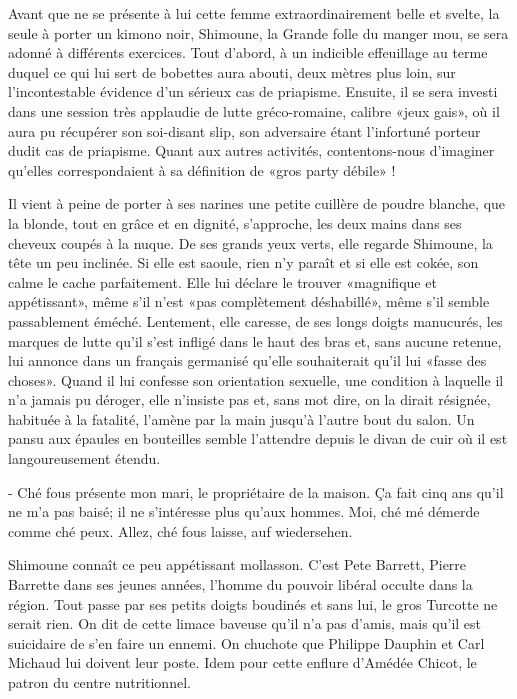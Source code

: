 Avant que ne se présente à lui cette femme extraordinairement belle et svelte, la seule à porter un kimono noir, Shimoune, la Grande folle du manger mou, se sera adonné à différents exercices. Tout d’abord, à un indicible effeuillage au terme duquel ce qui lui sert de bobettes aura abouti, deux mètres plus loin, sur l’incontestable évidence d’un sérieux cas de priapisme. Ensuite, il se sera investi dans une session très applaudie de lutte gréco-romaine, calibre «jeux gais», où il aura pu récupérer son soi-disant slip, son adversaire étant l’infortuné porteur dudit cas de priapisme. Quant aux autres activités, contentons-nous d’imaginer qu’elles correspondaient à sa définition de «gros party débile» !

Il vient à peine de porter à ses narines une petite cuillère de poudre blanche, que la blonde, tout en grâce et en dignité, s’approche, les deux mains dans ses cheveux coupés à la nuque. De ses grands yeux verts, elle regarde Shimoune, la tête un peu inclinée. Si elle est saoule, rien n’y paraît et si elle est cokée, son calme le cache parfaitement. Elle lui déclare le trouver «magnifique et appétissant», même s’il n’est «pas complètement déshabillé», même s’il semble passablement éméché. Lentement, elle caresse, de ses longs doigts manucurés, les marques de lutte qu’il s’est infligé dans le haut des bras et, sans aucune retenue, lui annonce dans un français germanisé qu’elle souhaiterait qu’il lui «fasse des choses». Quand il lui confesse son orientation sexuelle, une condition à laquelle il n’a jamais pu déroger, elle n’insiste pas et, sans mot dire, on la dirait résignée, habituée à la fatalité, l’amène par la main jusqu’à l’autre bout du salon. Un pansu aux épaules en bouteilles semble l’attendre depuis le divan de cuir où il est langoureusement étendu.

- Ché fous présente mon mari, le propriétaire de la maison. Ça fait cinq ans qu’il ne m’a pas baisé; il ne s’intéresse plus qu’aux hommes. Moi, ché mé démerde comme ché peux. Allez, ché fous laisse, auf wiedersehen.

Shimoune connaît ce peu appétissant mollasson. C’est Pete Barrett, Pierre Barrette dans ses jeunes années, l’homme du pouvoir libéral occulte dans la région. Tout passe par ses petits doigts boudinés et sans lui, le gros Turcotte ne serait rien. On dit de cette limace baveuse qu’il n’a pas d’amis, mais qu’il est suicidaire de s’en faire un ennemi. On chuchote que Philippe Dauphin et Carl Michaud lui doivent leur poste. Idem pour cette enflure d’Amédée Chicot, le patron du centre nutritionnel.

